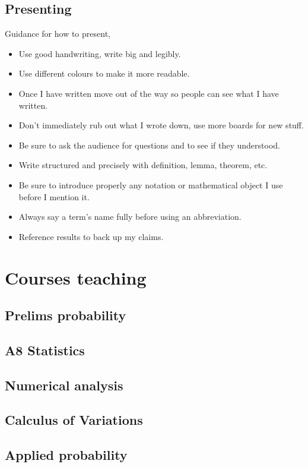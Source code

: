 \documentclass{article}
\begin{document}
\subsection{Presenting}
Guidance for how to present,
\begin{itemize}
    \item Use good handwriting, write big and legibly.
    \item Use different colours to make it more readable.
    \item Once I have written move out of the way so people can see what I have written.
    \item Don't immediately rub out what I wrote down, use more boards for new stuff.
    \item Be sure to ask the audience for questions and to see if they understood.
    \item Write structured and precisely with definition, lemma, theorem, etc.
    \item Be sure to introduce properly any notation or mathematical object I use before I mention it.
    \item Always say a term's name fully before using an abbreviation.
    \item Reference results to back up my claims.
\end{itemize}
\section{Courses teaching}
\subsection{Prelims probability}

\subsection{A8 Statistics}

\subsection{Numerical analysis}

\subsection{Calculus of Variations}

\subsection{Applied probability}
\end{document}
